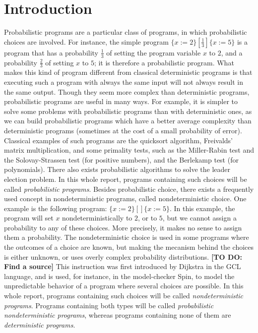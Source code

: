 \documentclass[a4paper,10pt]{llncs}
\newcommand\todo[1]{{\color{red}\textbf{[TO DO:  #1]}}}
\begin{document}
\section{Introduction}
\label{sec:intro}
Probabilistic programs are a particular class of programs, in which probabilistic choices are involved. For instance, the simple program $\{ x := 2 \} [\frac{1}{3}] \{ x := 5 \}$ is a program that has a probability $\frac{1}{3}$ of setting the program variable $x$ to $2$, and a probability $\frac{2}{3}$ of setting $x$ to $5$; it is therefore a probabilistic program. What makes this kind of program different from classical deterministic programs is that executing such a program with always the same input will not always result in the same output. Though they seem more complex than deterministic programs, probabilistic programs are useful in many ways. For example, it is simpler to solve some problems with probabilistic programs than with deterministic ones, as we can build probabilistic programs which have a better average complexity than deterministic programs (sometimes at the cost of a small probability of error). Classical examples of such programs are the quicksort algorithm, Freivalds' matrix multiplication, and some primality tests, such as the Miller-Rabin test and the Solovay-Strassen test (for positive numbers), and the Berlekamp test (for polynomials). There also exists probabilistic algorithms to solve the leader election problem. In this whole report, programs containing such choices will be called \emph{probabilistic programs}.\newline 
Besides probabilistic choice, there exists a frequently used concept in nondeterministic programs, called nondeterministic choice. One example is the following program: $\{ x := 2 \} [\!] \{ x := 5 \}$. In this example, the program will set $x$ nondeterministically to $2$, or to $5$, but we cannot assign a probability to any of these choices. More precisely, it makes no sense to assign them a probability. The nondeterministic choice is used in some programs where the outcomes of a choice are known, but making the mecanism behind the choices is either unknown, or uses overly complex probability distributions. \todo{Find a source} This instruction was first introduced by Dijkstra \cite{Dijkstra76} in the GCL language, and is used, for instance, in the model-checker Spin, to model the unpredictable behavior of a program where several choices are possible. In this whole report, programs containing such choices will be called \emph{nondeterministic programs}. Programs containing both types will be called \emph{probabilistic nondeterministic programs}, whereas programs containing none of them are \emph{deterministic programs}.\bigskip
\end{document}
